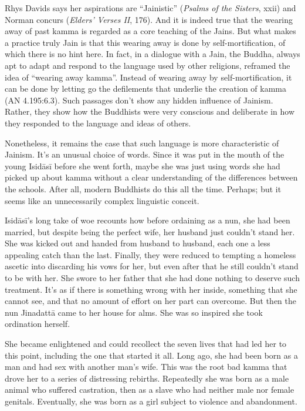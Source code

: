 \documentclass[12pt,openany]{book}%
\begin{document}
Rhys Davids says her aspirations are “Jainistic” (\textit{Psalms of the Sisters}, xxii) and Norman concurs (\textit{Elders’ Verses II}, 176). And it is indeed true that the wearing away of past kamma is regarded as a core teaching of the Jains. But what makes a practice truly Jain is that this wearing away is done by self-mortification, of which there is no hint here. In fact, in a dialogue with a Jain, the Buddha, always apt to adapt and respond to the language used by other religions, reframed the idea of “wearing away kamma”. Instead of wearing away by self-mortification, it can be done by letting go the defilements that underlie the creation of kamma (AN 4.195:6.3). Such passages don’t show any hidden influence of Jainism. Rather, they show how the Buddhists were very conscious and deliberate in how they responded to the language and ideas of others.

Nonetheless, it remains the case that such language is more characteristic of Jainism. It’s an unusual choice of words. Since it was put in the mouth of the young \textsanskrit{Isidāsī} before she went forth, maybe she was just using words she had picked up about kamma without a clear understanding of the differences between the schools. After all, modern Buddhists do this all the time. Perhaps; but it seems like an unnecessarily complex linguistic conceit.

\textsanskrit{Isidāsī}’s long take of woe recounts how before ordaining as a nun, she had been married, but despite being the perfect wife, her husband just couldn’t stand her. She was kicked out and handed from husband to husband, each one a less appealing catch than the last. Finally, they were reduced to tempting a homeless ascetic into discarding his vows for her, but even after that he still couldn’t stand to be with her. She swore to her father that she had done nothing to deserve such treatment. It’s as if there is something wrong with her inside, something that she cannot see, and that no amount of effort on her part can overcome. But then the nun \textsanskrit{Jinadattā} came to her house for alms. She was so inspired she took ordination herself.

She became enlightened and could recollect the seven lives that had led her to this point, including the one that started it all. Long ago, she had been born as a man and had sex with another man’s wife. This was the root bad kamma that drove her to a series of distressing rebirths. Repeatedly she was born as a male animal who suffered castration, then as a slave who had neither male nor female genitals. Eventually, she was born as a girl subject to violence and abandonment.
\end{document}
